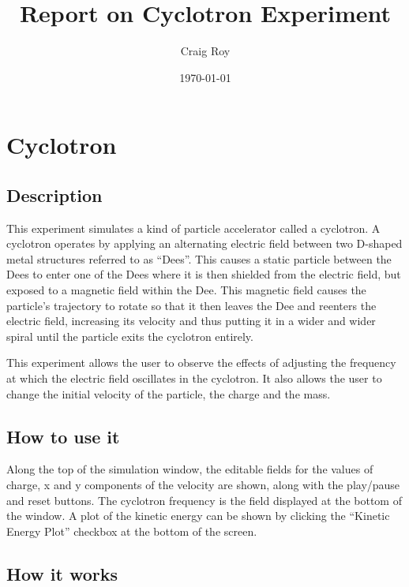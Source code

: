 \documentclass[11pt]{article}
\title{Report on Cyclotron Experiment}
\author{Craig Roy}
\date{\today}
\begin{document}
\maketitle


\section*{Cyclotron}
\label{sec-1}
\subsection*{Description}
\label{sec-1-1}

This experiment simulates a kind of particle accelerator called a
cyclotron. A cyclotron operates by applying an alternating electric
field between two D-shaped metal structures referred to as
``Dees''. This causes a static particle between the Dees to enter one of
the Dees where it is then shielded from the electric field, but
exposed to a magnetic field within the Dee. This magnetic field
causes the particle's trajectory to rotate so that it then leaves the Dee and reenters the electric field, increasing its velocity and thus putting it in a wider and wider spiral until the particle exits the cyclotron entirely.

This experiment allows the user to observe the effects of adjusting
the frequency at which the electric field oscillates in the
cyclotron. It also allows the user to change the initial velocity of
the particle, the charge and the mass.
\subsection*{How to use it}
\label{sec-1-2}

Along the top of the simulation window, the editable fields for the
values of charge, x and y components of the velocity are shown, along
with the play/pause and reset buttons.
The cyclotron frequency is the field displayed at the bottom of the
window. A plot of the kinetic energy can be shown by clicking the
``Kinetic Energy Plot'' checkbox at the bottom of the screen.
\subsection*{How it works}
\label{sec-1-3}
\end{document}

